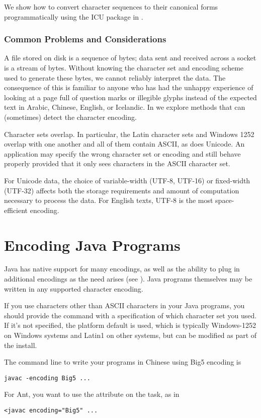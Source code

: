 We show how to convert character sequences to their canonical forms
programmatically using the ICU package in .

\subsubsection{Common Problems and Considerations}\label{section:char-problems}

A file stored on disk is a sequence of bytes; data sent and received
across a socket is a stream of bytes.  Without knowing the character set
and encoding scheme used to generate these bytes, we cannot reliably
interpret the data.
The consequence of this is familiar to anyone
who has had the unhappy experience of looking at
a page full of question marks or illegible glyphs
instead of the expected text in Arabic, Chinese,
English, or Icelandic.
In  we explore methods
that can (sometimes) detect the character encoding.

Character sets overlap.
In particular, the Latin character sets
and Windows 1252 overlap with one another and all of them
contain ASCII, as does Unicode.
An application may specify the wrong character set or encoding
and still behave properly provided that it only sees characters
in the ASCII character set.

For Unicode data, the choice of variable-width (UTF-8, UTF-16)
or fixed-width (UTF-32) affects both the storage requirements
and amount of computation necessary to process the data.
For English texts, UTF-8 is the most space-efficient encoding.

\section{Encoding Java Programs}

Java has native support for many encodings, as well as the ability to
plug in additional encodings as the need arises (see
).  Java programs themselves may be
written in any supported character encoding.

If you use characters other than ASCII characters in your Java
programs, you should provide the  command with a
specification of which character set you used.  If it's not specified,
the platform default is used, which is typically Windows-1252 on
Windows systems and Latin1 on other systems, but can be modified as
part of the install.  

The command line to write your programs in Chinese using Big5 encoding
is
%
\begin{verbatim}
javac -encoding Big5 ...
\end{verbatim}
%
For Ant, you want to use the  attribute on the
 task, as in
%
\begin{verbatim}
<javac encoding="Big5" ...
\end{verbatim}


